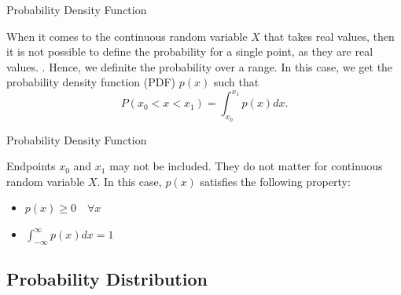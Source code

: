 \documentclass[aspectratio=169,xcolor=dvipsnames,svgnames,x11names,fleqn]{beamer}
\begin{document}
\begin{frame}[containsverbatim]{Probability Density Function}
    
    
    When it comes to the continuous random variable $X$ that takes real values, then it is not possible to define the probability for a single point, as they are real values. {\color{red}{At what real value we should define a probability -- there can be a possibility of an infinite number after a decimal point!!!}. }
    Hence, we definite the probability over a range. In this case, we get the probability density function (PDF) $p(x)$ such that 
    \begin{equation}
        P(x_0 < x < x_1) = \int_{x_0}^{x_1} p(x)dx.
    \end{equation}

\end{frame}

\begin{frame}[containsverbatim]{Probability Density Function}
    
    

    Endpoints ${x_0}$ and ${x_1}$ may not be included. They do not matter for continuous random variable $X$. In this case, $p(x)$ satisfies the following property:
    \begin{itemize}
        \item $p(x) \geq 0 \quad \forall x$
        \item $\int_{-\infty}^\infty p(x) dx = 1$
    \end{itemize}
  

    \end{frame}
    

\subsection{Probability Distribution}
\begin{frame}
    \subsectionpage
\end{frame}
\end{document}
